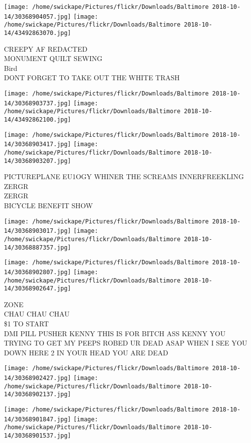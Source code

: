 \documentclass[10pt,letterpaper]{article}
\begin{document}
\texttt{[image: /home/swickape/Pictures/flickr/Downloads/Baltimore 2018-10-14/30368904057.jpg]}
\texttt{[image: /home/swickape/Pictures/flickr/Downloads/Baltimore 2018-10-14/43492863070.jpg]}

CREEPY AF REDACTED\\
MONUMENT QUILT SEWING\\
Bird\\
DONT FORGET TO TAKE OUT THE WHITE TRASH
\pagebreak

\texttt{[image: /home/swickape/Pictures/flickr/Downloads/Baltimore 2018-10-14/30368903737.jpg]}
\texttt{[image: /home/swickape/Pictures/flickr/Downloads/Baltimore 2018-10-14/43492862100.jpg]}

\texttt{[image: /home/swickape/Pictures/flickr/Downloads/Baltimore 2018-10-14/30368903417.jpg]}
\texttt{[image: /home/swickape/Pictures/flickr/Downloads/Baltimore 2018-10-14/30368903207.jpg]}

PICTUREPLANE EU1OGY WHINER THE SCREAMS INNERFREEKLING\\
ZERGR\\
ZERGR\\
BICYCLE BENEFIT SHOW
\pagebreak

\texttt{[image: /home/swickape/Pictures/flickr/Downloads/Baltimore 2018-10-14/30368903017.jpg]}
\texttt{[image: /home/swickape/Pictures/flickr/Downloads/Baltimore 2018-10-14/30368887357.jpg]}

\texttt{[image: /home/swickape/Pictures/flickr/Downloads/Baltimore 2018-10-14/30368902807.jpg]}
\texttt{[image: /home/swickape/Pictures/flickr/Downloads/Baltimore 2018-10-14/30368902647.jpg]}

ZONE\\
CHAU CHAU CHAU\\
\$1 TO START\\
DMI PILL PUSHER KENNY THIS IS FOR BITCH ASS KENNY YOU TRYING TO GET MY PEEPS ROBED UR DEAD ASAP WHEN I SEE YOU DOWN HERE 2 IN YOUR HEAD YOU ARE DEAD
\pagebreak

\texttt{[image: /home/swickape/Pictures/flickr/Downloads/Baltimore 2018-10-14/30368902427.jpg]}
\texttt{[image: /home/swickape/Pictures/flickr/Downloads/Baltimore 2018-10-14/30368902137.jpg]}

\texttt{[image: /home/swickape/Pictures/flickr/Downloads/Baltimore 2018-10-14/30368901847.jpg]}
\texttt{[image: /home/swickape/Pictures/flickr/Downloads/Baltimore 2018-10-14/30368901537.jpg]}
\end{document}
